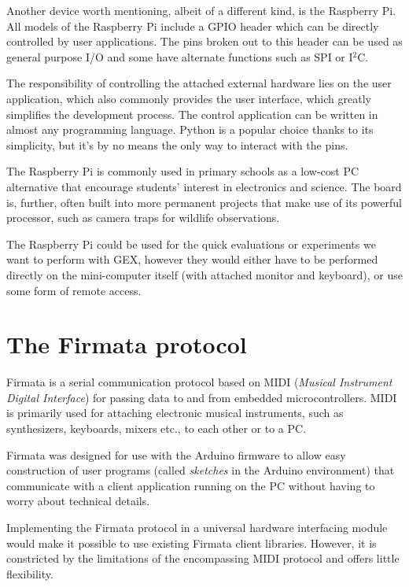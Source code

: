 
Another device worth mentioning, albeit of a different kind, is the Raspberry Pi. All models of the Raspberry Pi include a GPIO header which can be directly controlled by user applications. The pins broken out to this header can be used as general purpose I/O and some have alternate functions such as SPI or I$^2$C.

The responsibility of controlling the attached external hardware lies on the user application, which also commonly provides the user interface, which greatly simplifies the development process. The control application can be written in almost any programming language. Python is a popular choice thanks to its simplicity, but it's by no means the only way to interact with the pins.

The Raspberry Pi is commonly used in primary schools as a low-cost PC alternative that encourage students' interest in electronics and science. The board is, further, often built into more permanent projects that make use of its powerful processor, such as camera traps for wildlife observations. 

The Raspberry Pi could be used for the quick evaluations or experiments we want to perform with GEX, however they would either have to be performed directly on the mini-computer itself (with attached monitor and keyboard), or use some form of remote access. 

\section{The Firmata protocol}


Firmata is a serial communication protocol based on MIDI (\textit{Musical Instrument Digital Interface}) for passing data to and from embedded microcontrollers. MIDI is primarily used for attaching electronic musical instruments, such as synthesizers, keyboards, mixers etc., to each other or to a PC.

Firmata was designed for use with the Arduino firmware to allow easy construction of user programs (called \textit{sketches} in the Arduino environment) that communicate with a client application running on the PC without having to worry about technical details.

Implementing the Firmata protocol in a universal hardware interfacing module would make it possible to use existing Firmata client libraries. However, it is constricted by the limitations of the encompassing MIDI protocol and offers little flexibility.

